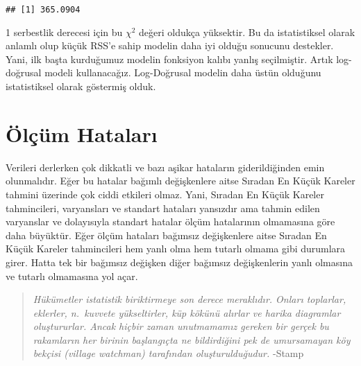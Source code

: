\documentclass[
]{book}
\newenvironment{Shaded}{\begin{snugshade}}{\end{snugshade}}
\newcommand{\DecValTok}[1]{\textcolor[rgb]{0.00,0.00,0.81}{#1}}
\newcommand{\KeywordTok}[1]{\textcolor[rgb]{0.13,0.29,0.53}{\textbf{#1}}}
\newcommand{\NormalTok}[1]{#1}
\newcommand{\OperatorTok}[1]{\textcolor[rgb]{0.81,0.36,0.00}{\textbf{#1}}}
\newcommand{\StringTok}[1]{\textcolor[rgb]{0.31,0.60,0.02}{#1}}
\begin{document}
\begin{Shaded}
\end{Shaded}

\begin{verbatim}
## [1] 365.0904
\end{verbatim}

1 serbestlik derecesi için bu \(\chi^2\) değeri oldukça yüksektir. Bu da istatistiksel olarak anlamlı olup küçük RSS'e sahip modelin daha iyi olduğu sonucunu destekler. Yani, ilk başta kurduğumuz modelin fonksiyon kalıbı yanlış seçilmiştir. Artık log-doğrusal modeli kullanacağız. Log-Doğrusal modelin daha üstün olduğunu istatistiksel olarak göstermiş olduk.

\hypertarget{uxf6luxe7uxfcm-hatalarux131}{%
\section{Ölçüm Hataları}\label{uxf6luxe7uxfcm-hatalarux131}}

Verileri derlerken çok dikkatli ve bazı aşikar hataların giderildiğinden emin olunmalıdır. Eğer bu hatalar bağımlı değişkenlere aitse Sıradan En Küçük Kareler tahmini üzerinde çok ciddi etkileri olmaz. Yani, Sıradan En Küçük Kareler tahmincileri, varyansları ve standart hataları yansızdır ama tahmin edilen varyanslar ve dolayısıyla standart hatalar ölçüm hatalarının olmamasına göre daha büyüktür. Eğer ölçüm hataları bağımsız değişkenlere aitse Sıradan En Küçük Kareler tahmincileri hem yanlı olma hem tutarlı olmama gibi durumlara girer. Hatta tek bir bağımsız değişken diğer bağımsız değişkenlerin yanlı olmasına ve tutarlı olmamasına yol açar.

\begin{quote}
\emph{Hükümetler istatistik biriktirmeye son derece meraklıdır. Onları toplarlar, eklerler, n.~kuvvete yükseltirler, küp kökünü alırlar ve harika diagramlar oluştururlar. Ancak hiçbir zaman unutmamamız gereken bir gerçek bu rakamların her birinin başlangıçta ne bildirdiğini pek de umursamayan köy bekçisi (village watchman) tarafından oluşturulduğudur.} -Stamp
\end{quote}
\end{document}
